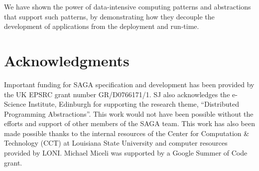 \documentclass[conference,final]{IEEEtran}
\newcommand{\jhanote}[1]{ {\textcolor{red} { ***SJ: #1 }}}
\newcommand{\jhanote}[1]{}
\begin{document}
We have shown the power of data-intensive computing patterns and
abstractions that support such patterns, by demonstrating how they
decouple the development of applications from the deployment and
run-time.







\section{Acknowledgments}

Important funding for SAGA specification and development has been
provided by the UK EPSRC grant number GR/D0766171/1.  SJ also
acknowledges the e-Science Institute, Edinburgh for supporting the
research theme, ``Distributed Programming Abstractions''.  This work
would not have been possible without the efforts and support of other
members of the SAGA team. This work has also been made possible thanks
to the internal resources of the Center for Computation \& Technology
(CCT) at Louisiana State University and computer resources provided by
LONI. Michael Miceli was supported by a Google Summer of Code grant.
 
\end{document}
